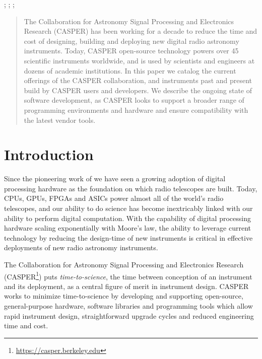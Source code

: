 \documentclass{ws-jai}
\begin{document}

\begin{history} ; ; ;
\end{history}

\begin{abstract}

The Collaboration for Astronomy Signal Processing and Electronics Research
(CASPER) has been working for a decade to reduce the time and cost of
designing, building and deploying new digital radio astronomy instruments.
Today, CASPER open-source technology powers over 45 scientific instruments
worldwide, and is used by scientists and engineers at dozens of academic
institutions.  In this paper we catalog the current offerings of the CASPER
collaboration, and instruments past and present build by CASPER users and developers.
We describe the ongoing state of software development, as CASPER looks to
support a broader range of programming environments and hardware and ensure compatibility
with the latest vendor tools.

\end{abstract}


\section{Introduction}

Since the pioneering work of \citet{Weinreb} we
have seen a growing adoption of digital processing hardware as the foundation
on which radio telescopes are built.  Today, CPUs, GPUs, FPGAs and ASICs power
almost all of the world's radio telescopes, and our ability to do science has
become inextricably linked with our ability to perform digital computation.
With the capability of digital processing hardware scaling exponentially with
Moore's law, the ability to leverage current technology by reducing the
design-time of new instruments is critical in effective deployments of new
radio astronomy instruments.

The Collaboration for Astronomy Signal Processing and Electronics Research
(CASPER\footnote{\url{https://casper.berkeley.edu}}) puts
\emph{time-to-science}, the time between conception of an instrument and its
deployment, as a central figure of merit in instrument design. CASPER works to
minimize time-to-science by developing and supporting open-source,
general-purpose hardware, software libraries and programming tools which allow
rapid instrument design, straightforward upgrade cycles and reduced engineering time and cost.
\end{document}
